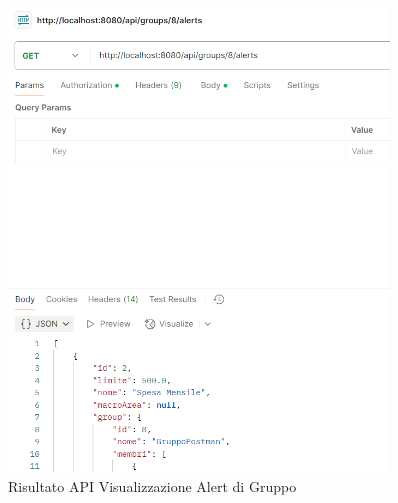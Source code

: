 \begin{figure}[H]
    \centering
    \includegraphics[width=0.9\textwidth]{images/GetAlertsForGroup.png}  
    \caption{Risultato API Visualizzazione Alert di Gruppo}
    \label{fig:api_view_group_alerts}  
\end{figure}
